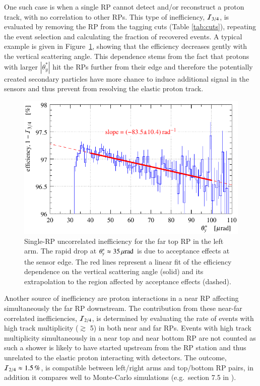 One such case is when a single RP cannot detect and/or reconstruct a proton track, with no correlation to other RPs. This type of inefficiency, ${\cal I}_{3/4}$, is evaluated by removing the RP from the tagging cuts (Table \ref{tab:cuts}), repeating the event selection and calculating the fraction of recovered events. A typical example is given in Figure~\ref{fig:eff 3/4}, showing that the efficiency decreases gently with the vertical scattering angle. This dependence stems from the fact that protons with larger $|\theta_y^*|$ hit the RPs further from their edge and therefore the potentially created secondary particles have more chance to induce additional signal in the sensors and thus prevent from resolving the elastic proton track.

\begin{figure}
\begin{center}
\includegraphics{fig/eff3outof4_details_fits.pdf}
\vskip-3mm
\caption{%
Single-RP uncorrelated inefficiency for the far top RP in the left arm. The rapid drop at $\theta_y^* \approx 35\,{\rm \mu rad}$ is due to acceptance effects at the sensor edge. The red lines represent a linear fit of the efficiency dependence on the vertical scattering angle (solid) and its extrapolation to the region affected by acceptance effects (dashed).
}
\label{fig:eff 3/4}
\end{center}
\end{figure}

Another source of inefficiency are proton interactions in a near RP affecting simultaneously the far RP downstream. The contribution from these near-far correlated inefficiencies, ${\cal I}_{2/4}$, is determined by evaluating the rate of events with high track multiplicity ($\gtrsim$ 5) in both near and far RPs. Events with high track multiplicity simultaneously in a near top and near bottom RP are not counted as such a shower is likely to have started upstream from the RP station and thus unrelated to the elastic proton interacting with detectors. The outcome, ${\cal I}_{2/4} \approx 1.5\,{\rm \%}$, is compatible between left/right arms and top/bottom RP pairs, in addition it compares well to Monte-Carlo simulations (e.g.~section 7.5 in \cite{hubert-thesis}).

